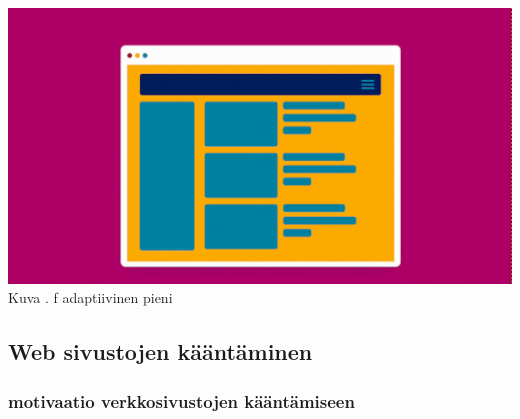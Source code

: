 \documentclass[11pt,a4paper,titlepage,oneside]{article}
\begin{document}
\bigskip

\includegraphics[width = 15cm]{src/public/oppar/adaptivesmall.png}\\
Kuva \getImgCount {}. f adaptiivinen pieni\citemissing




















\newpage
\subsection{Web sivustojen kääntäminen}














\subsubsection{motivaatio verkkosivustojen kääntämiseen}
\end{document}
